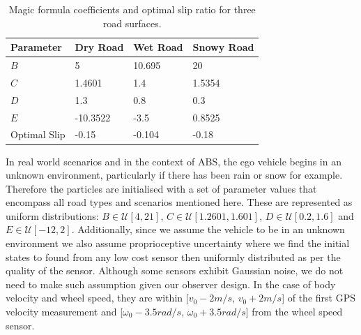\documentclass[onecolumn,journal,draftclsnofoot]{IEEEtran}
\begin{document}
\begin{table}[h]
\caption{Magic formula coefficients and optimal slip ratio for three road surfaces.}
\begin{center}
\begin{tabular}{ | m{5.2em}| m{1.5cm}| m{1.5cm}| m{1.5cm}|} 
  \hline
  Parameter & Dry Road & Wet Road & Snowy Road \\ 
  \hline
  \(B\) & 5 & 10.695 & 20\\ 
  \hline
  \(C\) & 1.4601 & 1.4 & 1.5354\\ 
  \hline
  \(D\) & 1.3 & 0.8 & 0.3\\ 
  \hline
  \(E\) & -10.3522 & -3.5 & 0.8525\\ 
  \hline
  Optimal Slip & -0.15 & -0.104 & -0.18\\
  \hline
\end{tabular}
\label{table:2}
\end{center}
\end{table}

In real world scenarios and in the context of ABS, the ego vehicle begins in an unknown environment, particularly if there has been rain or snow for example. 
Therefore the particles are initialised with a set of parameter values that encompass all road types and scenarios mentioned here.
These are represented as uniform distributions: \(B \in \mathcal{U}\left[4,21\right]\), \(C \in \mathcal{U}\left[1.2601,1.601\right]\), \(D \in \mathcal{U}\left[0.2,1.6\right]\) and \(E \in \mathcal{U}\left[-12,2\right]\). 
Additionally, since we assume the vehicle to be in an unknown environment we also assume proprioceptive uncertainty where we find the initial states to found from any low cost sensor then uniformly distributed as per the quality of the sensor. Although some sensors exhibit Gaussian noise, we do not need to make such assumption given our observer design. 
In the case of body velocity and wheel speed, they are within [\(v_0 -2m/s\), \(v_0+2m/s\)] of the first GPS velocity measurement and [\(\omega_0-3.5 rad/s\), \(\omega_0+3.5 rad/s\)] from the wheel speed sensor.
\end{document}
